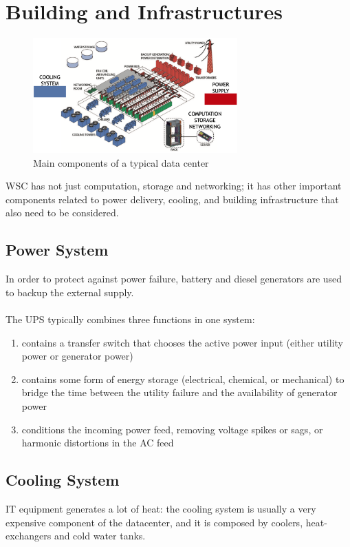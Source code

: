 \documentclass[10pt, oneside]{article}
\begin{document}
\newpage

\section{Building and Infrastructures}
\begin{figure}[H]
    \begin{center}
    \includegraphics[width=0.7\textwidth]{img/img26.png}
    \caption{Main components of a typical data center}
    \label{fig:Main components}
    \end{center}
\end{figure}
WSC has not just computation, storage and networking; it has other important components related to power delivery, cooling, and building infrastructure that also need to be considered.
\subsection{Power System}
In order to protect against power failure, battery and diesel generators are used to backup the external supply.\\ \\
The UPS typically combines three functions in one system:
\begin{enumerate}
    \item contains a transfer switch that chooses the active power input (either utility power or generator power)
    \item contains some form of energy storage (electrical, chemical, or mechanical) to bridge the time between the utility failure and the availability of generator power
    \item conditions the incoming power feed, removing voltage spikes or sags, or harmonic distortions in the AC feed
\end{enumerate}
\subsection{Cooling System}
IT equipment generates a lot of heat: the cooling system is usually a very expensive component of the datacenter, and it is composed by coolers, heat-exchangers and cold water tanks.
\end{document}
